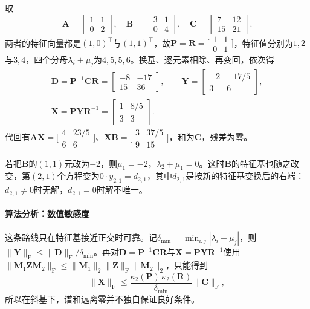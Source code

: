 \begin{example}[特征基下的逐元素求解]
\label{ex:ls-sylvester-eigenbasis}
取
\[
 \bm A=\begin{bmatrix}1&1\\0&2\end{bmatrix},\quad
 \bm B=\begin{bmatrix}3&1\\0&4\end{bmatrix},\quad
 \bm C=\begin{bmatrix}7&12\\15&21\end{bmatrix}.
\]
两者的特征向量都是$(1,0)^\top$与$(1,1)^\top$，故$\bm P=\bm R=\bigl[\begin{smallmatrix}1&1\\0&1\end{smallmatrix}\bigr]$，特征值分别为$1,2$与$3,4$，四个分母$\lambda_i+\mu_j$为$4,5,5,6$。换基、逐元素相除、再变回，依次得
\[
 \begin{gathered}
 \bm D=\bm P^{-1}\bm C\bm R=\begin{bmatrix}-8&-17\\15&36\end{bmatrix},\qquad
 \bm Y=\begin{bmatrix}-2&-17/5\\3&6\end{bmatrix},\\
 \bm X=\bm P\bm Y\bm R^{-1}=\begin{bmatrix}1&8/5\\3&3\end{bmatrix}.
 \end{gathered}
\]
代回有$\bm A\bm X=\bigl[\begin{smallmatrix}4&23/5\\6&6\end{smallmatrix}\bigr]$、$\bm X\bm B=\bigl[\begin{smallmatrix}3&37/5\\9&15\end{smallmatrix}\bigr]$，和为$\bm C$，残差为零。

若把$\bm B$的$(1,1)$元改为$-2$，则$\mu_1=-2$，$\lambda_2+\mu_1=0$。这时$\bm B$的特征基也随之改变，第$(2,1)$个方程变为$0\cdot y_{2,1}=d_{2,1}$，其中$d_{2,1}$是按新的特征基变换后的右端：$d_{2,1}\neq0$时无解，$d_{2,1}=0$时解不唯一。
\end{example}

\paragraph{算法分析：数值敏感度}
这条路线只在特征基接近正交时可靠。记$\delta_{\min}=\min_{i,j}|\lambda_i+\mu_j|$，则$\lVert\bm Y\rVert_{\mathrm F}\leq\lVert\bm D\rVert_{\mathrm F}/\delta_{\min}$。再对$\bm D=\bm P^{-1}\bm C\bm R$与$\bm X=\bm P\bm Y\bm R^{-1}$使用$\lVert\bm M_1\bm Z\bm M_2\rVert_{\mathrm F}\leq\lVert\bm M_1\rVert_2\lVert\bm Z\rVert_{\mathrm F}\lVert\bm M_2\rVert_2$，只能得到
\[
 \lVert\bm X\rVert_{\mathrm F}
 \leq\frac{\kappa_2(\bm P)\,\kappa_2(\bm R)}{\delta_{\min}}\lVert\bm C\rVert_{\mathrm F},
\]
所以在斜基下，谱和远离零并不独自保证良好条件。


